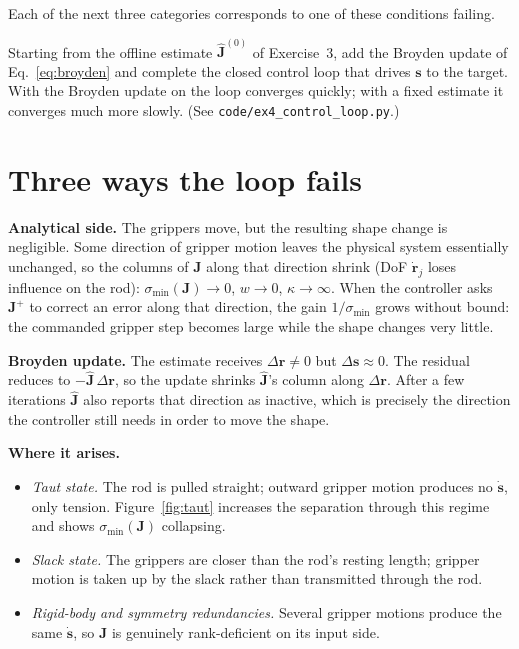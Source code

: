\documentclass[11pt,a4paper]{article}
\begin{document}
\noindent Each of the next three categories corresponds to one of these conditions failing.

\begin{labexercise}[Exercise~4]
Starting from the offline estimate $\hat{\mathbf{J}}^{(0)}$ of Exercise~3, add the Broyden update of
Eq.~\eqref{eq:broyden} and complete the closed control loop that drives $\mathbf{s}$ to the target.
With the Broyden update on the loop converges quickly; with a fixed estimate it converges
much more slowly.
(See \texttt{code/ex4\_control\_loop.py}.)
\end{labexercise}

\newpage
\section{Three ways the loop fails}
\label{sec:taxonomy}

\begin{physbox}
\textbf{Analytical side.} The grippers move, but the resulting shape change is negligible.
Some direction of gripper motion leaves the physical system essentially unchanged, so the columns of $\mathbf{J}$
along that direction shrink (DoF $\dot{\mathbf{r}}_j$ loses influence on the rod):
$\sigma_{\min}(\mathbf{J})\to 0$, $w\to 0$, $\kappa\to\infty$. When the controller asks $\mathbf{J}^{+}$ to
correct an error along that direction, the gain $1/\sigma_{\min}$ grows without bound: the
commanded gripper step becomes large while the shape changes very little.

\medskip
\noindent\textbf{Broyden update.} The estimate receives $\Delta\mathbf{r} \neq 0$ but
$\Delta\mathbf{s} \approx 0$. The residual reduces to $-\hat{\mathbf{J}}\,\Delta\mathbf{r}$, so the update shrinks
$\hat{\mathbf{J}}$'s column along $\Delta\mathbf{r}$. After a few iterations $\hat{\mathbf{J}}$ also reports that
direction as inactive, which is precisely the direction the controller still needs in
order to move the shape.

\medskip
\noindent\textbf{Where it arises.}
\begin{itemize}
    \item \emph{Taut state.} The rod is pulled straight; outward gripper motion
    produces no $\dot{\mathbf{s}}$, only tension. Figure~\ref{fig:taut} increases the separation
    through this regime and shows $\sigma_{\min}(\mathbf{J})$ collapsing.
    \item \emph{Slack state.} The grippers are closer than the rod's resting length;
    gripper motion is taken up by the slack rather than transmitted through the rod.
    \item \emph{Rigid-body and symmetry redundancies.} Several gripper motions
    produce the same $\dot{\mathbf{s}}$, so $\mathbf{J}$ is genuinely rank-deficient on its input side.
\end{itemize}
\end{physbox}
\end{document}

